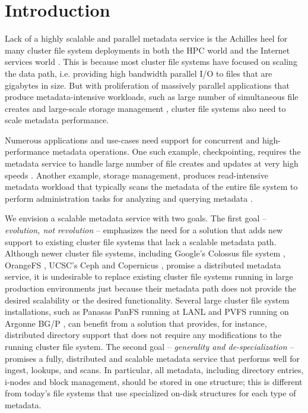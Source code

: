 \section{Introduction}

Lack of a highly scalable and parallel metadata service is the 
Achilles heel for many cluster file system deployments in both the HPC world 
\cite{hecfsio:tr06, hpcs-io:2008} and the Internet services world \cite{HDFS}.
This is because most cluster file systems have focused on scaling the
data path, i.e. providing high bandwidth parallel I/O to files that are 
gigabytes in size.
But with proliferation of massively parallel applications that produce 
metadata-intensive workloads, such as large number of simultaneous file creates
\cite{PLFS} and large-scale storage management \cite{issdm}, cluster file systems 
also need to scale metadata performance.

Numerous applications and use-cases need support for concurrent and 
high-performance metadata operations.
One such example, checkpointing, requires the metadata service to
handle large number of file creates and updates at very high speeds 
\cite{PLFS}.
Another example, storage management, produces read-intensive metadata workload
that typically scans the metadata of the entire file system to perform
administration tasks for analyzing and querying metadata \cite{filemgmt-ucsc, magellan-ucsc}.

We envision a scalable metadata service with two goals. 
The first goal -- \textit{evolution, not revolution} -- emphasizes the need for
a solution that adds new support to existing cluster file systems that lack a 
scalable metadata path.
Although newer cluster file systems, including Google's Colossus file system 
\cite{50mfiles-in-googlefs:fikes10}, OrangeFS \cite{OrangeFS}, UCSC's Ceph \cite{ceph:weil06} and 
Copernicus \cite{sfs-ucsc}, promise a distributed metadata 
service, it is 
undesirable to replace existing cluster file systems running in large production
environments just because their metadata path does not provide the desired
scalability or the desired functionality.
Several large cluster file system installations, such as Panasas PanFS running
at LANL \cite{panfs:welch08} and PVFS running on Argonne BG/P 
\cite{pvfs:www,bgp}, can 
benefit from a solution that provides, for instance, distributed directory support 
that does not require any modifications to the running cluster file system.
The second goal -- \textit{generality and de-specialization} -- promises a 
fully, distributed and
scalable metadata service that performs well for ingest, lookups, and scans.
In particular, all metadata, including directory entries, i-nodes and block
management, should be stored in one structure; this is different from
today's file systems that use specialized on-disk structures for each type of 
metadata.

